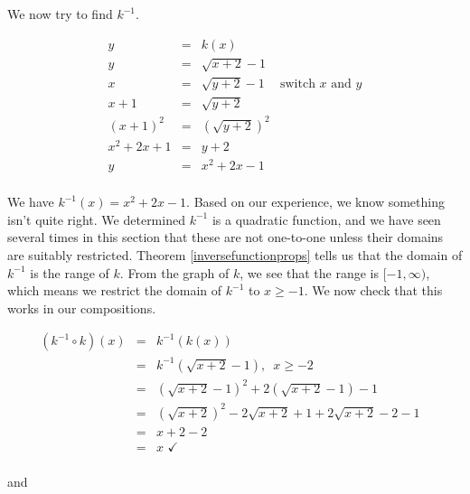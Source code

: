 {\begin{enumerate}
We now try to find $k^{-1}$.

\[ \begin{array}{rclr}

y & = & k(x) & \\

y & = & \sqrt{x+2}-1 & \\

x & = & \sqrt{y+2} - 1 & \mbox{switch $x$ and $y$} \\

x+1 & = & \sqrt{y+2} & \\

(x+1)^2 & = & \left(\sqrt{y+2}\right)^2 & \\

x^2 + 2x + 1 & = & y + 2 & \\

y & = & x^2 + 2x - 1 & \\

\end{array} \]

\drawexampleline

We have $k^{-1}(x) = x^2+2x-1$.  Based on our experience, we know something isn't quite right.  We determined $k^{-1}$ is a quadratic function, and we have seen several times in this section that these are not one-to-one unless their domains are suitably restricted.  Theorem \ref{inversefunctionprops} tells us that the domain of $k^{-1}$ is the range of $k$.  From the graph of $k$, we see that the range is $[-1, \infty)$, which means we restrict the domain of $k^{-1}$ to $x \geq -1$. We now check that this works in our compositions.

\[ \begin{array}{rclr}

\left(k^{-1} \circ k \right)(x) & = & k^{-1}(k(x)) & \\ 

& = & k^{-1}\left(\sqrt{x+2}-1\right), \, \, \, x \geq -2 & \\
& = & \left(\sqrt{x+2}-1\right)^2 + 2\left(\sqrt{x+2}-1\right) - 1& \\
& = & \left(\sqrt{x+2}\right)^2 - 2\sqrt{x+2} + 1 + 2 \sqrt{x+2} - 2 - 1 & \\
& = &x+2 -2  & \\
& = & x \, \, \checkmark &\\
\end{array}\]

and


\[ \begin{array}{rclr}


\end{array}\]
\end{enumerate}}
